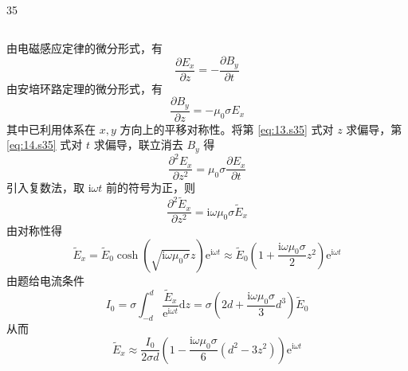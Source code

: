 \begin{solution}{35}
\begin{subsolution}
\begin{equation}
            \label{eq:12.s35}
        \end{equation}
    \end{subsolution}
    \begin{subsolution}
        由电磁感应定律的微分形式，有
        \begin{equation}
            \frac {\partial E _ {x}}{\partial z} = - \frac {\partial B _ {y}}{\partial t}
            \label{eq:13.s35}
        \end{equation}
        由安培环路定理的微分形式，有
        \begin{equation}
            \frac {\partial B _ {y}}{\partial z} = - \mu_ {0} \sigma E _ {x}
            \label{eq:14.s35}
        \end{equation}
        其中已利用体系在 $x, y$ 方向上的平移对称性。将第 \eqref{eq:13.s35} 式对 $z$ 求偏导，第 \eqref{eq:14.s35} 式对 $t$ 求偏导，联立消去 $B_y$ 得
        \begin{equation}
            \frac {\partial^ {2} E _ {x}}{\partial z ^ {2}} = \mu_ {0} \sigma \frac {\partial E _ {x}}{\partial t}
            \label{eq:15.s35}
        \end{equation}
        引入复数法，取 $\mathrm{i}\omega t$ 前的符号为正，则
        \begin{equation}
            \frac {\partial^ {2} \tilde {E} _ {x}}{\partial z ^ {2}} = \mathrm{i} \omega \mu_ {0} \sigma \tilde {E} _ {x}
            \label{eq:16.s35}
        \end{equation}
        由对称性得
        \begin{equation}
            \tilde {E} _ {x} = \tilde {E} _ {0} \cosh (\sqrt {\mathrm{i} \omega \mu_ {0} \sigma} z) \mathrm{e} ^ {\mathrm{i} \omega t} \approx \tilde {E} _ {0} \left(1 + \frac {\mathrm{i} \omega \mu_ {0} \sigma}{2} z ^ {2}\right) \mathrm{e} ^ {\mathrm{i} \omega t}
            \label{eq:17.s35}
        \end{equation}
        由题给电流条件
        \begin{equation}
            I _ {0} = \sigma \int_ {- d} ^ {d} \frac {\tilde {E} _ {x}}{\mathrm{e} ^ {\mathrm{i} \omega t}} \mathrm{d} z = \sigma \left(2 d + \frac {\mathrm{i} \omega \mu_ {0} \sigma}{3} d ^ {3}\right) \tilde {E} _ {0}
            \label{eq:18.s35}
        \end{equation}
        从而
        \begin{equation}
            \tilde {E} _ {x} \approx \frac {I _ {0}}{2 \sigma d} \left(1 - \frac {\mathrm{i} \omega \mu_ {0} \sigma}{6} (d ^ {2} - 3 z ^ {2})\right) \mathrm{e} ^ {\mathrm{i} \omega t}

\end{equation}
\end{subsolution}
\end{solution}
